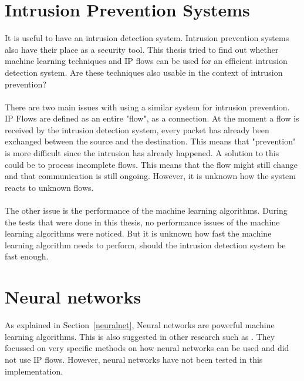 \section{Intrusion Prevention Systems}
It is useful to have an intrusion detection system. Intrusion prevention systems also have their place as a security tool. This thesis tried to find out whether machine learning techniques and IP flows can be used for an efficient intrusion detection system. Are these techniques also usable in the context of intrusion prevention? \\
\\
There are two main issues with using a similar system for intrusion prevention. IP Flows are defined as an entire "flow", as a connection. At the moment a flow is received by the intrusion detection system, every packet has already been exchanged between the source and the destination. This means that "prevention" is more difficult since the intrusion has already happened. A solution to this could be to process incomplete flows. This means that the flow might still change and that communication is still ongoing. However, it is unknown how the system reacts to unknown flows. \\
\\
The other issue is the performance of the machine learning algorithms. During the tests that were done in this thesis, no performance issues of the machine learning algorithms were noticed. But it is unknown how fast the machine learning algorithm needs to perform, should the intrusion detection system be fast enough.

\section{Neural networks}
As explained in Section~\ref{neuralnet}, Neural networks are powerful machine learning algorithms. This is also suggested in other research such as \cite{koch2009fast}. They focussed on very specific methods on how neural networks can be used and did not use IP flows. However, neural networks have not been tested in this implementation. 